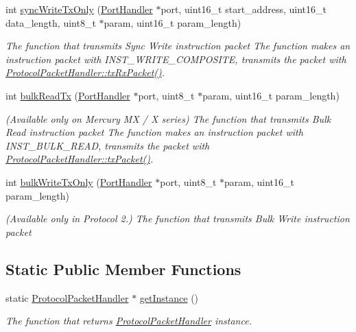 \begin{DoxyCompactItemize}
int \hyperlink{classmercury_1_1_protocol_packet_handler_a4a08a338c48d6c9ef42183ca74297dce}{sync\+Write\+Tx\+Only} (\hyperlink{classmercury_1_1_port_handler}{Port\+Handler} $\ast$port, uint16\+\_\+t start\+\_\+address, uint16\+\_\+t data\+\_\+length, uint8\+\_\+t $\ast$param, uint16\+\_\+t param\+\_\+length)
\begin{DoxyCompactList}\small\item\em The function that transmits Sync Write instruction packet  The function makes an instruction packet with I\+N\+S\+T\+\_\+\+W\+R\+I\+T\+E\+\_\+\+C\+O\+M\+P\+O\+S\+I\+TE,  transmits the packet with \hyperlink{classmercury_1_1_protocol_packet_handler_a68b02f23af616886d0795ea12debd613}{Protocol\+Packet\+Handler\+::tx\+Rx\+Packet()}. \end{DoxyCompactList}\item 
int \hyperlink{classmercury_1_1_protocol_packet_handler_a81f298b0d67e9c578a3b2b839f90b378}{bulk\+Read\+Tx} (\hyperlink{classmercury_1_1_port_handler}{Port\+Handler} $\ast$port, uint8\+\_\+t $\ast$param, uint16\+\_\+t param\+\_\+length)
\begin{DoxyCompactList}\small\item\em (Available only on Mercury MX / X series) The function that transmits Bulk Read instruction packet  The function makes an instruction packet with I\+N\+S\+T\+\_\+\+B\+U\+L\+K\+\_\+\+R\+E\+AD,  transmits the packet with \hyperlink{classmercury_1_1_protocol_packet_handler_a245f01395d9684bc58788e8a06de3ffc}{Protocol\+Packet\+Handler\+::tx\+Packet()}. \end{DoxyCompactList}\item 
int \hyperlink{classmercury_1_1_protocol_packet_handler_ac6c15829fd1bd0e321a1d63076e11839}{bulk\+Write\+Tx\+Only} (\hyperlink{classmercury_1_1_port_handler}{Port\+Handler} $\ast$port, uint8\+\_\+t $\ast$param, uint16\+\_\+t param\+\_\+length)
\begin{DoxyCompactList}\small\item\em (Available only in Protocol 2.) The function that transmits Bulk Write instruction packet \end{DoxyCompactList}\end{DoxyCompactItemize}
\subsection*{Static Public Member Functions}
\begin{DoxyCompactItemize}
\item 
static \hyperlink{classmercury_1_1_protocol_packet_handler}{Protocol\+Packet\+Handler} $\ast$ \hyperlink{classmercury_1_1_protocol_packet_handler_a0de2b506e22d7673b1e5c83ddc507a74}{get\+Instance} ()
\begin{DoxyCompactList}\small\item\em The function that returns \hyperlink{classmercury_1_1_protocol_packet_handler}{Protocol\+Packet\+Handler} instance. \end{DoxyCompactList}\end{DoxyCompactItemize}


